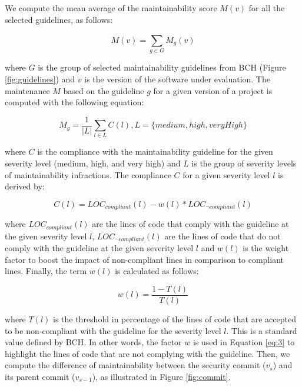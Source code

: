 \documentclass[10pt,conference]{IEEEtran}
\begin{document}
We compute the mean average of the maintainability score $M(v)$ for all the selected guidelines, as follows:

\begin{equation}
    M(v) = \sum_{g \in G}^{} M_{g}(v)
\end{equation}

\noindent
where $G$ is the group of selected maintainability guidelines from BCH (Figure \ref{fig:guidelines}) and $v$ is the
version of the software under evaluation. The maintenance $M$ based on the guideline $g$ for a given version of a project is computed with the following equation:

\begin{equation}
    M_{g} = \frac{1}{|L|} \sum_{l \in L}^{} C(l) , L = \{medium, high, veryHigh\}
\end{equation}

\noindent
where $C$ is the compliance with the maintainability guideline for the given severity level (medium, high, and very high) and
$L$ is the group of severity levels of maintainability infractions. The compliance $C$ for a given severity level $l$ is derived by:

\begin{equation}\label{eq:3}
    C(l) = LOC_{compliant}(l) - w(l) * LOC_{\neg compliant}(l)
\end{equation}

\noindent
where $LOC_{compliant}(l)$ are the lines of code that comply with the guideline at the given severity level $l$, $LOC_{\neg compliant}(l)$ are the lines of code that do not comply with the guideline at the given
severity level $l$ and $w(l)$ is the weight factor to boost the impact of
non-compliant lines in comparison to compliant lines. Finally, the term $w(l)$ is calculated as follows:

\begin{equation}
    w(l) = \frac{1 - T(l)}{T(l)}
\end{equation}

\noindent
where $T(l)$ is the threshold in percentage of the lines of code that are accepted to be non-compliant with the guideline for the severity level $l$. This is a standard value defined by BCH. In other words, the factor $w$ is used in Equation \ref{eq:3} to highlight the lines of code that are not complying with the guideline. Then, we compute the difference of maintainability between the security commit ($v_{s}$) and its parent commit ($v_{s-1}$), as illustrated in Figure \ref{fig:commit}.
\end{document}
